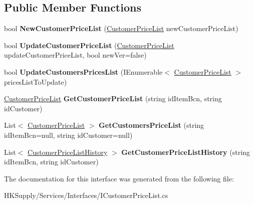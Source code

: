 \subsection*{Public Member Functions}
\begin{DoxyCompactItemize}
\item 
\mbox{\label{interface_h_k_supply_1_1_services_1_1_interfaces_1_1_i_customer_price_list_a4c67c5a454eb65869cc9b1604cfedf84}} 
bool {\bfseries New\+Customer\+Price\+List} (\mbox{\hyperlink{class_h_k_supply_1_1_models_1_1_customer_price_list}{Customer\+Price\+List}} new\+Customer\+Price\+List)
\item 
\mbox{\label{interface_h_k_supply_1_1_services_1_1_interfaces_1_1_i_customer_price_list_a395e4f8f1da8a06513643561399ee28f}} 
bool {\bfseries Update\+Customer\+Price\+List} (\mbox{\hyperlink{class_h_k_supply_1_1_models_1_1_customer_price_list}{Customer\+Price\+List}} update\+Customer\+Price\+List, bool new\+Ver=false)
\item 
\mbox{\label{interface_h_k_supply_1_1_services_1_1_interfaces_1_1_i_customer_price_list_a6004f90912be6a6cabfd56a5aaa50f48}} 
bool {\bfseries Update\+Customers\+Prices\+List} (I\+Enumerable$<$ \mbox{\hyperlink{class_h_k_supply_1_1_models_1_1_customer_price_list}{Customer\+Price\+List}} $>$ prices\+List\+To\+Update)
\item 
\mbox{\label{interface_h_k_supply_1_1_services_1_1_interfaces_1_1_i_customer_price_list_aa2f56c0e7912edca0d505907d1428d90}} 
\mbox{\hyperlink{class_h_k_supply_1_1_models_1_1_customer_price_list}{Customer\+Price\+List}} {\bfseries Get\+Customer\+Price\+List} (string id\+Item\+Bcn, string id\+Customer)
\item 
\mbox{\label{interface_h_k_supply_1_1_services_1_1_interfaces_1_1_i_customer_price_list_aa4aa73743bae6e0ae09a87b54d8db983}} 
List$<$ \mbox{\hyperlink{class_h_k_supply_1_1_models_1_1_customer_price_list}{Customer\+Price\+List}} $>$ {\bfseries Get\+Customers\+Price\+List} (string id\+Item\+Bcn=null, string id\+Customer=null)
\item 
\mbox{\label{interface_h_k_supply_1_1_services_1_1_interfaces_1_1_i_customer_price_list_a56442fcbbb8372b723cf23f73e9463ee}} 
List$<$ \mbox{\hyperlink{class_h_k_supply_1_1_models_1_1_customer_price_list_history}{Customer\+Price\+List\+History}} $>$ {\bfseries Get\+Customer\+Price\+List\+History} (string id\+Item\+Bcn, string id\+Customer)
\end{DoxyCompactItemize}


The documentation for this interface was generated from the following file\+:\begin{DoxyCompactItemize}
\item 
H\+K\+Supply/\+Services/\+Interfaces/I\+Customer\+Price\+List.\+cs\end{DoxyCompactItemize}
